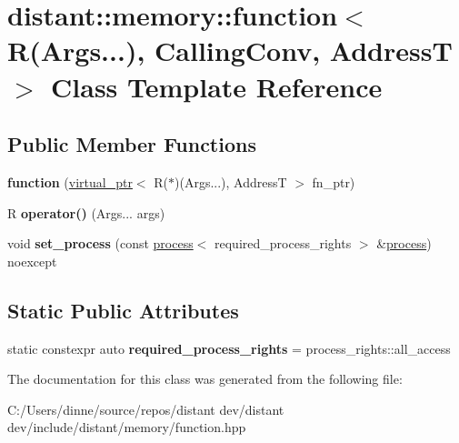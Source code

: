 \hypertarget{classdistant_1_1memory_1_1function_3_01_r_07_args_8_8_8_08_00_01_calling_conv_00_01_address_t_01_4}{}\section{distant\+:\+:memory\+:\+:function$<$ R(Args...), Calling\+Conv, AddressT $>$ Class Template Reference}
\label{classdistant_1_1memory_1_1function_3_01_r_07_args_8_8_8_08_00_01_calling_conv_00_01_address_t_01_4}
\subsection*{Public Member Functions}
\begin{DoxyCompactItemize}
\item 
\mbox{\label{classdistant_1_1memory_1_1function_3_01_r_07_args_8_8_8_08_00_01_calling_conv_00_01_address_t_01_4_acbda97a4a9bb552c1975344651e7918e}} 
{\bfseries function} (\mbox{\hyperlink{classdistant_1_1memory_1_1virtual__ptr}{virtual\+\_\+ptr}}$<$ R($\ast$)(Args...), AddressT $>$ fn\+\_\+ptr)
\item 
\mbox{\label{classdistant_1_1memory_1_1function_3_01_r_07_args_8_8_8_08_00_01_calling_conv_00_01_address_t_01_4_a611d9de83f572c092ef421fb59abc400}} 
R {\bfseries operator()} (Args... args)
\item 
\mbox{\label{classdistant_1_1memory_1_1function_3_01_r_07_args_8_8_8_08_00_01_calling_conv_00_01_address_t_01_4_aa3e56a849a300645283d8a36f3ee31b6}} 
void {\bfseries set\+\_\+process} (const \mbox{\hyperlink{classdistant_1_1kernel__objects_1_1process}{process}}$<$ required\+\_\+process\+\_\+rights $>$ \&\mbox{\hyperlink{classdistant_1_1kernel__objects_1_1process}{process}}) noexcept
\end{DoxyCompactItemize}
\subsection*{Static Public Attributes}
\begin{DoxyCompactItemize}
\item 
\mbox{\label{classdistant_1_1memory_1_1function_3_01_r_07_args_8_8_8_08_00_01_calling_conv_00_01_address_t_01_4_ab07fcaedbf8783ee5ab8be04c883019a}} 
static constexpr auto {\bfseries required\+\_\+process\+\_\+rights} = process\+\_\+rights\+::all\+\_\+access
\end{DoxyCompactItemize}


The documentation for this class was generated from the following file\+:\begin{DoxyCompactItemize}
\item 
C\+:/\+Users/dinne/source/repos/distant dev/distant dev/include/distant/memory/function.\+hpp\end{DoxyCompactItemize}
